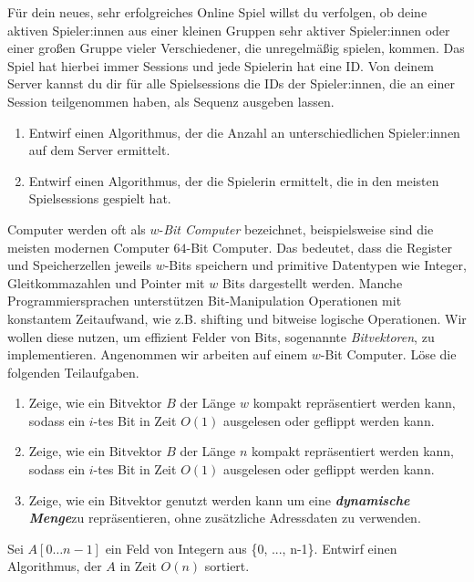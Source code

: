 \documentclass{uebung_cs}
\newcommand{\dynset}{\textit{\textbf{dynamische Menge}}}
\begin{document}
\begin{aufgabe}
	Für dein neues, sehr erfolgreiches Online Spiel willst du verfolgen, ob deine aktiven Spieler:innen aus einer kleinen Gruppen sehr aktiver Spieler:innen oder einer großen Gruppe vieler Verschiedener, die unregelmäßig spielen, kommen.
	Das Spiel hat hierbei immer Sessions und jede Spielerin hat eine ID.
	Von deinem Server kannst du dir für alle Spielsessions die IDs der Spieler:innen, die an einer Session teilgenommen haben, als Sequenz ausgeben lassen.
	\begin{enumerate}
		\item Entwirf einen Algorithmus, der die Anzahl an unterschiedlichen Spieler:innen auf dem Server ermittelt.
		\item Entwirf einen Algorithmus, der die Spielerin ermittelt, die in den meisten Spielsessions gespielt hat.
	\end{enumerate}
\end{aufgabe}

\begin{aufgabe}[Bitvektoren]
	Computer werden	oft als $w$-\textit{Bit Computer} bezeichnet, beispielsweise sind die meisten modernen Computer $64$-Bit Computer.
	Das bedeutet, dass die Register und Speicherzellen jeweils $w$-Bits speichern und primitive Datentypen wie Integer, Gleitkommazahlen und Pointer mit $w$ Bits dargestellt werden.
	Manche Programmiersprachen unterstützen Bit-Manipulation Operationen mit konstantem Zeitaufwand, wie z.B. shifting und bitweise logische Operationen.
	Wir wollen diese nutzen, um effizient Felder von Bits, sogenannte \textit{Bitvektoren}, zu implementieren.
	Angenommen wir arbeiten auf einem $w$-Bit Computer.
	Löse die folgenden Teilaufgaben.
	\begin{enumerate}
		\item Zeige, wie ein Bitvektor $B$ der Länge $w$ kompakt repräsentiert werden kann, sodass ein $i$-tes Bit in Zeit $O(1)$ ausgelesen oder geflippt werden kann.
		\item Zeige, wie ein Bitvektor $B$ der Länge $n$ kompakt repräsentiert werden kann, sodass ein $i$-tes Bit in Zeit $O(1)$ ausgelesen oder geflippt werden kann.
		\item Zeige, wie ein Bitvektor genutzt werden kann um eine \dynset zu repräsentieren, ohne zusätzliche Adressdaten zu verwenden.
	\end{enumerate}
\end{aufgabe}

\begin{aufgabe}
	Sei $A[0\hdots n-1]$ ein Feld von Integern aus \{0, ..., n-1\}.
	Entwirf einen Algorithmus, der $A$ in Zeit $O(n)$ sortiert.
\end{aufgabe}
\end{document}
